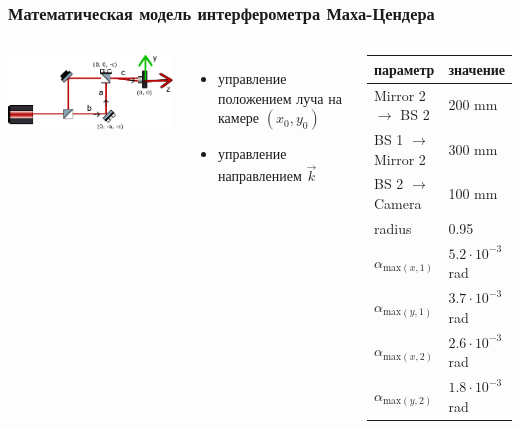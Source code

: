 \begin{frame}
\frametitle{Математическая модель интерферометра Маха-Цендера}
\begin{columns}
  \centering
  \includegraphics[width=1\linewidth]{images/MZI_matmodel.pdf}
  \begin{itemize}
    \item управление положением луча на камере $(x_0, y_0)$
    \item управление направлением $\vec{k}$
  \end{itemize}

\begin{table} [htbp]
    \centering
    \begin{threeparttable}
        \begin{tabular}{| p{2.5cm} || p{2cm} |}
            \hline
            \hline
            параметр & значение \\
            \hline
            Mirror 2 $\to$ BS 2 & 200 mm\\
            BS 1 $\to$ Mirror 2 & 300 mm\\
            BS 2 $\to$ Camera & 100 mm\\
            radius & 0.95\\
            $\alpha_{{\mathrm{max}}(x,1)}$ & $5.2 \cdot 10^{-3}$ rad\\
            $\alpha_{{\mathrm{max}}(y,1)}$ & $3.7 \cdot 10^{-3}$ rad\\
            $\alpha_{{\mathrm{max}}(x,2)}$ & $2.6 \cdot 10^{-3}$ rad\\
            $\alpha_{{\mathrm{max}}(y,2)}$ & $1.8 \cdot 10^{-3}$ rad\\
            \hline
            \hline
        \end{tabular}
    \end{threeparttable}
\end{table}

\end{columns} 
\end{frame}


